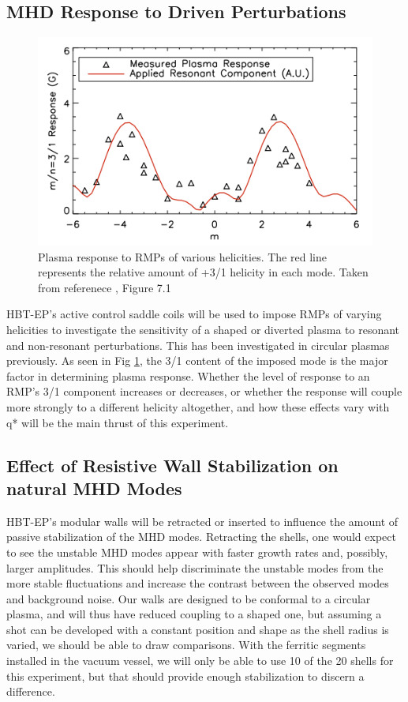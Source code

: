 \documentclass[aps,prl,twocolumn,superscriptaddress,groupedaddress]{revtex4}  %
\begin{document}
	\subsection{MHD Response to Driven Perturbations}
\begin{figure}[b]
	\centering
\includegraphics[scale=.525]{../Plots/Shiraki_thesis_Fig_7_1.png}\caption{Plasma response to RMPs of various helicities.  The red line represents the relative amount of +3/1 helicity in each mode.  Taken from referenece \cite{Shiraki}, Figure 7.1}
	\label{Shiraki_plot}
	\end{figure}
HBT-EP's active control saddle coils will be used to impose RMPs of varying helicities to investigate the sensitivity of a shaped or diverted plasma to resonant and non-resonant perturbations.  This has been investigated in circular plasmas previously\cite{Shiraki}.  As seen in Fig \ref{Shiraki_plot}, the 3/1 content of the imposed mode is the major factor in determining plasma response.  Whether the level of response to an RMP's 3/1 component increases or decreases, or whether the response will couple more strongly to a different helicity altogether, and how these effects vary with q* will be the main thrust of this experiment.\par
	\subsection{Effect of Resistive Wall Stabilization on natural MHD Modes}	 
HBT-EP's modular walls will be retracted or inserted to influence the amount of passive stabilization of the MHD modes.  Retracting the shells, one would expect to see the unstable MHD modes appear with faster growth rates and, possibly, larger amplitudes\cite{Shiraki}.  This should help discriminate the unstable modes from the more stable fluctuations and increase the contrast between the observed modes and background noise.  Our walls are designed to be conformal to a circular plasma, and will thus have reduced coupling to a shaped one, but assuming a shot can be developed with a constant position and shape as the shell radius is varied, we should be able to draw comparisons.  With the ferritic segments installed in the vacuum vessel, we will only be able to use 10 of the 20 shells for this experiment, but that should provide enough stabilization to discern a difference.\par
\end{document}

